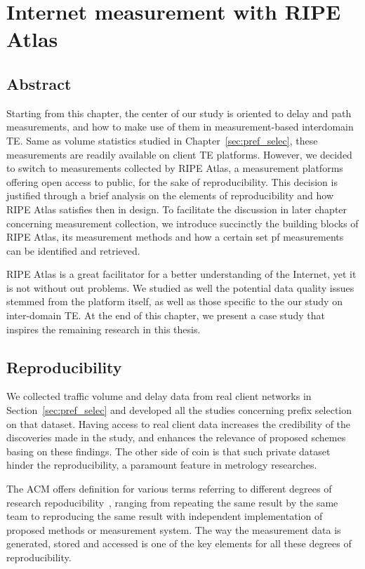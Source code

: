 \chapter{Internet measurement with RIPE Atlas}
\label{sec:ripe_atlas}
\section*{Abstract}
Starting from this chapter, the center of our study is oriented to delay and path measurements, and how to make use of them in measurement-based interdomain \ac{TE}.
Same as volume statistics studied in Chapter~\ref{sec:pref_selec}, these measurements are readily available on client TE platforms.
However, we decided to switch to measurements collected by RIPE Atlas, a measurement platforms offering open access to public, for the sake of reproducibility.
This decision is justified through a brief analysis on the elements of reproducibility and how RIPE Atlas satisfies then in design.
To facilitate the discussion in later chapter concerning measurement collection, we introduce succinctly the building blocks of RIPE Atlas, its measurement methods and how a certain set pf measurements can be identified and retrieved.

RIPE Atlas is a great facilitator for a better understanding of the Internet, yet it is not without out problems. We studied as well the potential data quality issues stemmed from the platform itself, as well as those specific to the our study on inter-domain TE.
At the end of this chapter, we present a case study that inspires the remaining research in this thesis.
\clearpage

\section{Reproducibility}
We collected traffic volume and delay data from real client networks in Section~\ref{sec:pref_selec} and developed all the studies concerning prefix selection on that dataset.
Having access to real client data increases the credibility of the discoveries made in the study, and enhances the relevance of proposed schemes basing on these findings.
The other side of coin is that such private dataset hinder the reproducibility, a paramount feature in metrology researches.

The \acf{ACM} offers definition for various terms referring to different degrees of research repoducibility~\cite{acm}, ranging from repeating the same result by the same team to reproducing the same result with independent implementation of proposed methods or measurement system.
The way the measurement data is generated, stored and accessed is one of the key elements for all these degrees of reproducibility.

